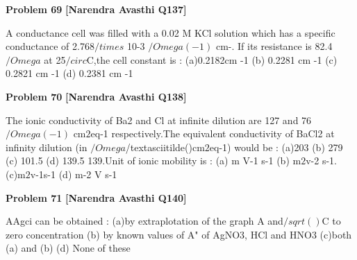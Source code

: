 \begin{problembox}
\textbf{Problem 69} \hfill \textbf{[Narendra Avasthi Q137]}
\label{q:ext-narendra_avasthi_all_questions-69}

A conductance cell was filled with a 0.02 M KCl solution which has a specific conductance of
2.768$/times$ 10-3 $/Omega(-1)$ cm-. If its resistance is 82.4 $/Omega$ at 25$/circ$C,the cell constant is :
(a)0.2182cm -1
(b) 0.2281 cm -1
(c) 0.2821 cm -1
(d) 0.2381 cm -1
\end{problembox}

\begin{problembox}
\textbf{Problem 70} \hfill \textbf{[Narendra Avasthi Q138]}
\label{q:ext-narendra_avasthi_all_questions-70}

The ionic conductivity of Ba2 and Cl at infinite dilution are 127 and 76 $/Omega(-1)$ cm$2$eq-1
respectively.The equivalent conductivity of BaCl2 at infinity dilution (in $/Omega$/textasciitilde()cm$2$eq-1)
would be :
(a)203
(b) 279
(c) 101.5
(d) 139.5
139.Unit of ionic mobility is :
(a) m V-1 s-1
(b) m$2$v-2 s-1.
(c)m$2$v-1s-1
(d) m-2 V s-1
\end{problembox}

\begin{problembox}
\textbf{Problem 71} \hfill \textbf{[Narendra Avasthi Q140]}
\label{q:ext-narendra_avasthi_all_questions-71}

AAgci can be obtained :
(a)by extraplotation of the graph A and$/sqrt()$C to zero concentration
(b) by known values of A" of AgNO3, HCl and HNO3
(c)both (a) and (b)
(d) None of these
\end{problembox}

